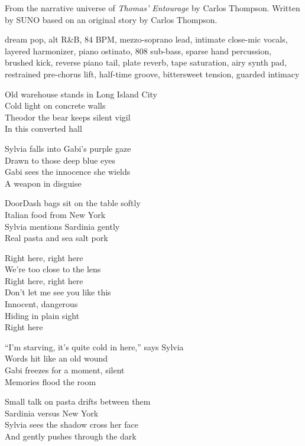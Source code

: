 
\begin{notes}
From the narrative universe of \emph{Thomas’ Entourage} by Carlos Thompson. %
Written by SUNO based on an original story by Carlos Thompson.
\end{notes}
\begin{style}
dream pop, alt R\&B, 84 BPM, mezzo-soprano lead, intimate close-mic vocals, layered harmonizer, piano ostinato, 808 sub-bass, sparse hand percussion, brushed kick, reverse piano tail, plate reverb, tape saturation, airy synth pad, restrained pre-chorus lift, half-time groove, bittersweet tension, guarded intimacy
\end{style}
\begin{lyrics}
Old warehouse stands in Long Island City\\
Cold light on concrete walls\\
Theodor the bear keeps silent vigil\\
In this converted hall

Sylvia falls into Gabi’s purple gaze\\
Drawn to those deep blue eyes\\
Gabi sees the innocence she wields\\
A weapon in disguise

DoorDash bags sit on the table softly\\
Italian food from New York\\
Sylvia mentions Sardinia gently\\
Real pasta and sea salt pork

Right here, right here\\
We’re too close to the lens\\
Right here, right here\\
Don’t let me see you like this\\
Innocent, dangerous\\
Hiding in plain sight\\
Right here

“I’m starving, it’s quite cold in here,” says Sylvia\\
Words hit like an old wound\\
Gabi freezes for a moment, silent\\
Memories flood the room

Small talk on pasta drifts between them\\
Sardinia versus New York\\
Sylvia sees the shadow cross her face\\
And gently pushes through the dark


\end{lyrics}
